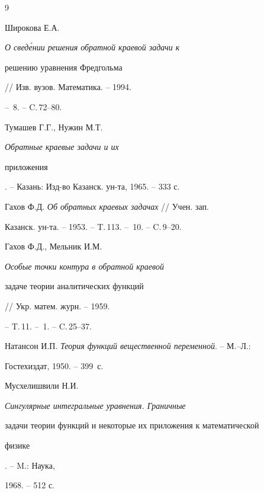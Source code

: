 \begin{thebibliography}{9}







Широкова Е.А. {\em О свед\'ении решения обратной краевой задачи к


решению уравнения Фредгольма} // Изв. вузов. Математика. -- 1994.


-- \No\,8. -- C.\,72--80.




Тумашев Г.Г., Нужин М.Т. {\em Обратные краевые задачи и их


приложения}. -- Казань: Изд-во Казанск. ун-та, 1965. -- 333 с.




Гахов Ф.Д. {\em Об обратных краевых задачах} // Учен. зап.


Казанск. ун-та. -- 1953. -- T.\,113. -- \No\,10. -- C.\,9--20.




Гахов Ф.Д., Мельник И.М. {\em Особые точки контура в обратной краевой


задаче теории аналитических функций} // Укр. матем. журн. -- 1959.


-- T.\,11. -- \No\,1. -- C.\,25--37.




Натансон И.П. {\em Теория функций вещественной переменной}. -- М.--Л.:


Гостехиздат, 1950. -- 399~с.




Мусхелишвили Н.И. {\em Сингулярные интегральные уравнения. Граничные


задачи теории функций и некоторые их приложения к математической


физике}. -- M.: Наука,


1968. -- 512 с.





\end{thebibliography}





\vskip 2cm












\label{end}






